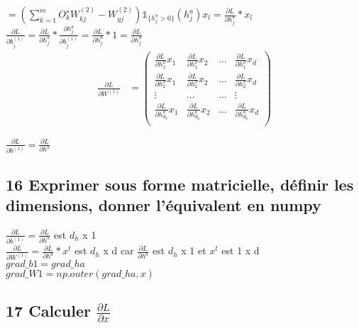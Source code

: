 \documentclass[12pt]{article}
\begin{document}
$= (\sum_{k=1}^m O_k^s W_{kj}^{(2)}- W_{yj}^{(2)})\mathbb{1}_{\{h_j^a>0\}}(h_j^a)x_l = \frac{\partial L}{\partial h_j^a}*x_l$\\

$\frac{\partial L}{\partial b_j^{(1)}} = \frac{\partial L}{\partial h_j^a}*\frac{\partial h_j^a}{\partial b_j^{(1)}} = \frac{\partial L}{\partial h_j^a}*1 =  \frac{\partial L}{\partial h_j^a}$\\

\begin{align*} 
\frac{\partial L}{\partial W^{(1)}}
	&= 
	\left(
     \begin{array}{rrrr}
         \frac{\partial L}{\partial h_1^a}x_1 &  \frac{\partial L}{\partial h_1^a}x_2&   \dots &   \frac{\partial L}{\partial h_1^a}x_d\\
         \frac{\partial L}{\partial h_2^a}x_1 &  \frac{\partial L}{\partial h_2^a}x_2 &   \dots &   \frac{\partial L}{\partial h_2^a}x_d\\
         \vdots & \dots & \dots & \vdots \\
	 \frac{\partial L}{\partial h_{d_{h}}^a}x_1 &  \frac{\partial L}{\partial h_{d_{h}}^a}x_2 &   \dots &   \frac{\partial L}{\partial h_{d_{h}}^a}x_d\\
       \end{array}
     \right)
\end{align*}

$\frac{\partial L}{\partial b^{(1)}} = \frac{\partial L}{\partial h^a}$


 \subsection{16 Exprimer sous forme matricielle, définir les dimensions, donner l'équivalent en numpy}

$\frac{\partial L}{\partial b^{(1)}} = \frac{\partial L}{\partial h^a}$ est $d_h$ x 1\\

$\frac{\partial L}{\partial W^{(1)}} = \frac{\partial L}{\partial h^a} * x^t$ est $d_h$ x d car $\frac{\partial L}{\partial h^a}$ est $d_h$ x 1 et $x^t$ est 1 x d\\

$grad\_b1 = grad\_ha$\\
$grad\_W1 = np.outer(grad\_ha, x)$\\

 \subsection{17 Calculer $\frac{\partial L}{\partial x}$}
\end{document}
